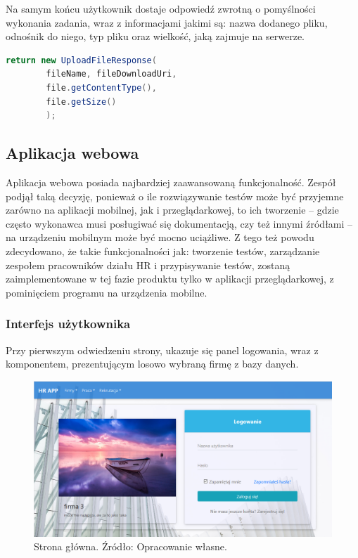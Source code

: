 \documentclass[twoside]{projektInzynierskiMS}
\numberwithin{figure}{section}
\begin{document}
Na samym końcu użytkownik dostaje odpowiedź zwrotną o pomyślności wykonania zadania, wraz z informacjami jakimi są: nazwa dodanego pliku, odnośnik do niego, typ pliku oraz wielkość, jaką zajmuje na serwerze. 
\newpage
\begin{lstlisting}[language=Java,caption=Utworzenie i zwrot modelu informującego o poprawnym dodaniu pliku. Źródło: Opracowanie własne.,captionpos=b]
    return new UploadFileResponse(
        fileName, fileDownloadUri,
        file.getContentType(), 
        file.getSize()
        );
\end{lstlisting}
    

\subsection{Aplikacja webowa}
Aplikacja webowa posiada najbardziej zaawansowaną funkcjonalność. Zespół podjął taką decyzję, ponieważ o ile rozwiązywanie testów może być przyjemne zarówno na aplikacji mobilnej, jak i przeglądarkowej, to ich tworzenie -- gdzie często wykonawca musi posługiwać się dokumentacją, czy też innymi źródłami – na urządzeniu mobilnym może być mocno uciążliwe. Z tego też powodu zdecydowano, że takie funkcjonalności jak: tworzenie testów, zarządzanie zespołem pracowników działu HR i przypisywanie testów, zostaną zaimplementowane w tej fazie produktu tylko w aplikacji przeglądarkowej, z pominięciem programu na urządzenia mobilne.

\newpage

\subsubsection{Interfejs użytkownika}
Przy pierwszym odwiedzeniu strony, ukazuje się panel logowania, wraz z komponentem, prezentującym losowo wybraną firmę z bazy danych. 

\begin{figure}[h!]
    \centering
    \includegraphics[width = \textwidth]{images/stronaGłówna.png}
    \caption{Strona główna. Źródło: Opracowanie własne.}
    \label{fig:strona_główna}
\end{figure}
\end{document}
